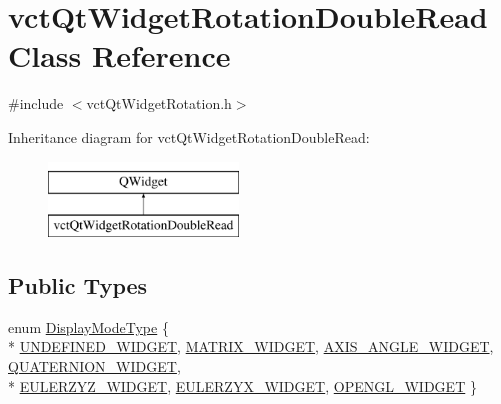 \hypertarget{classvct_qt_widget_rotation_double_read}{\section{vct\-Qt\-Widget\-Rotation\-Double\-Read Class Reference}
\label{classvct_qt_widget_rotation_double_read}
}


{\ttfamily \#include $<$vct\-Qt\-Widget\-Rotation.\-h$>$}

Inheritance diagram for vct\-Qt\-Widget\-Rotation\-Double\-Read\-:\begin{figure}[H]
\begin{center}
\leavevmode
\includegraphics[height=2.000000cm]{d4/d60/classvct_qt_widget_rotation_double_read}
\end{center}
\end{figure}
\subsection*{Public Types}
\begin{DoxyCompactItemize}
\item 
enum \hyperlink{classvct_qt_widget_rotation_double_read_a77ae5a0ee5fe231ad2f9dd020aad434c}{Display\-Mode\-Type} \{ \\*
\hyperlink{classvct_qt_widget_rotation_double_read_a77ae5a0ee5fe231ad2f9dd020aad434ca44f2e95cf2aa74f96e61297dd9d9a635}{U\-N\-D\-E\-F\-I\-N\-E\-D\-\_\-\-W\-I\-D\-G\-E\-T}, 
\hyperlink{classvct_qt_widget_rotation_double_read_a77ae5a0ee5fe231ad2f9dd020aad434cab4e7af571815b292da348c3526627d1e}{M\-A\-T\-R\-I\-X\-\_\-\-W\-I\-D\-G\-E\-T}, 
\hyperlink{classvct_qt_widget_rotation_double_read_a77ae5a0ee5fe231ad2f9dd020aad434caa75f45fc36381eb2add04f081db9e4bd}{A\-X\-I\-S\-\_\-\-A\-N\-G\-L\-E\-\_\-\-W\-I\-D\-G\-E\-T}, 
\hyperlink{classvct_qt_widget_rotation_double_read_a77ae5a0ee5fe231ad2f9dd020aad434ca7bafe70e904937d5d1fbf056d31cf976}{Q\-U\-A\-T\-E\-R\-N\-I\-O\-N\-\_\-\-W\-I\-D\-G\-E\-T}, 
\\*
\hyperlink{classvct_qt_widget_rotation_double_read_a77ae5a0ee5fe231ad2f9dd020aad434cab4a8bda77c869bea4ffd986641477262}{E\-U\-L\-E\-R\-Z\-Y\-Z\-\_\-\-W\-I\-D\-G\-E\-T}, 
\hyperlink{classvct_qt_widget_rotation_double_read_a77ae5a0ee5fe231ad2f9dd020aad434ca360cce806f5c77e80be67d68bf0c9f47}{E\-U\-L\-E\-R\-Z\-Y\-X\-\_\-\-W\-I\-D\-G\-E\-T}, 
\hyperlink{classvct_qt_widget_rotation_double_read_a77ae5a0ee5fe231ad2f9dd020aad434caf9ca8d54944bc35b1606430450b5e844}{O\-P\-E\-N\-G\-L\-\_\-\-W\-I\-D\-G\-E\-T}
 \}
\end{DoxyCompactItemize}
